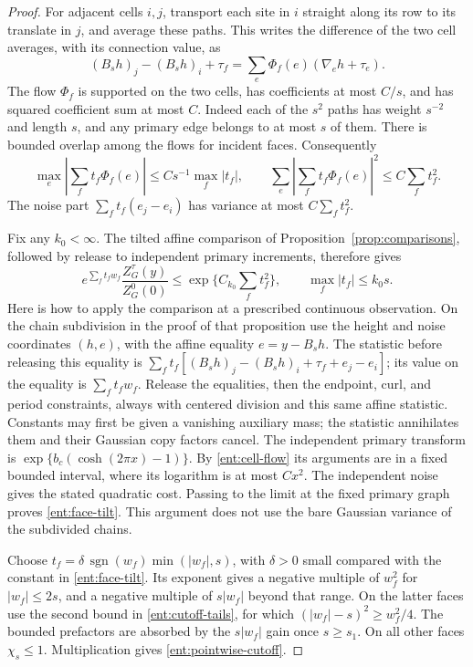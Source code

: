 \begin{proof}
For adjacent cells \(i,j\), transport each site in \(i\) straight
along its row to its translate in \(j\), and average these paths.
This writes the difference of the two cell averages, with its
connection value, as
\[
       (B_sh)_j-(B_sh)_i+\tau_f
              =\sum_e\Phi_f(e)(\nabla_eh+\tau_e).
\]
The flow \(\Phi_f\) is supported on the two cells, has coefficients
at most \(C/s\), and has squared coefficient sum at most \(C\).
Indeed each of the \(s^2\) paths has weight \(s^{-2}\) and length
\(s\), and any primary edge belongs to at most \(s\) of them.
There is bounded overlap among the flows for incident faces.
Consequently
\begin{equation}\label{ent:cell-flow}
 \max_e\left|\sum_f t_f\Phi_f(e)\right|
       \le Cs^{-1}\max_f|t_f|,
 \qquad
 \sum_e\left|\sum_f t_f\Phi_f(e)\right|^2
       \le C\sum_f t_f^2.
\end{equation}
The noise part \(\sum_ft_f(e_j-e_i)\) has variance at most
\(C\sum_ft_f^2\).

Fix any \(k_0<\infty\).  The tilted affine comparison of
Proposition~\ref{prop:comparisons}, followed by release to independent
primary increments, therefore gives
\begin{equation}\label{ent:face-tilt}
 e^{\sum_ft_fw_f}\frac{Z_G^\tau(y)}{Z_G^0(0)}
       \le \exp\{C_{k_0}\sum_ft_f^2\},
                 \qquad \max_f|t_f|\le k_0s .
\end{equation}
Here is how to apply the comparison at a prescribed continuous
observation.  On the chain subdivision in the proof of that
proposition use the height and noise coordinates \((h,e)\), with
the affine equality \(e=y-B_sh\).  The statistic before releasing
this equality is
\(\sum_f t_f[(B_sh)_j-(B_sh)_i+\tau_f+e_j-e_i]\); its value on the
equality is \(\sum_ft_fw_f\).  Release the equalities, then the
endpoint, curl, and period constraints, always with centered
division and this same affine statistic.  Constants may first be
given a vanishing auxiliary mass; the statistic annihilates them
and their Gaussian copy factors cancel.  The independent primary
transform is
\(\exp\{b_c(\cosh(2\pi x)-1)\}\).  By \eqref{ent:cell-flow} its
arguments are in a fixed bounded interval, where its logarithm is
at most \(C x^2\).  The independent noise gives the stated
quadratic cost.  Passing to the limit at the fixed primary graph
proves \eqref{ent:face-tilt}.  This argument does not use the bare
Gaussian variance of the subdivided chains.

Choose \(t_f=\delta\,\operatorname{sgn}(w_f)\min(|w_f|,s)\), with
\(\delta>0\) small compared with the constant in
\eqref{ent:face-tilt}.  Its exponent gives a negative multiple of
\(w_f^2\) for \(|w_f|\le2s\), and a negative multiple of
\(s|w_f|\) beyond that range.  On the latter faces use the second
bound in \eqref{ent:cutoff-tails}, for which
\((|w_f|-s)^2\ge w_f^2/4\).  The bounded prefactors are absorbed
by the \(s|w_f|\) gain once \(s\ge s_1\).  On all other faces
\(\chi_s\le1\).  Multiplication gives
\eqref{ent:pointwise-cutoff}.


\end{proof}

